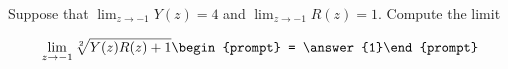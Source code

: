 \documentclass{ximera}
\author{Matthew Carr}
\begin{document}
\begin{exercise}
Suppose that $\lim_{z\to-1}Y(z)=4$ and $\lim_{z\to-1}R(z)=1$. Compute the limit

\[
\lim_{z\to -1 } \sqrt[2]{Y(z)R(z)+1}\begin{prompt} = \answer{1}\end{prompt}
\]
\end{exercise}
\end{document}
